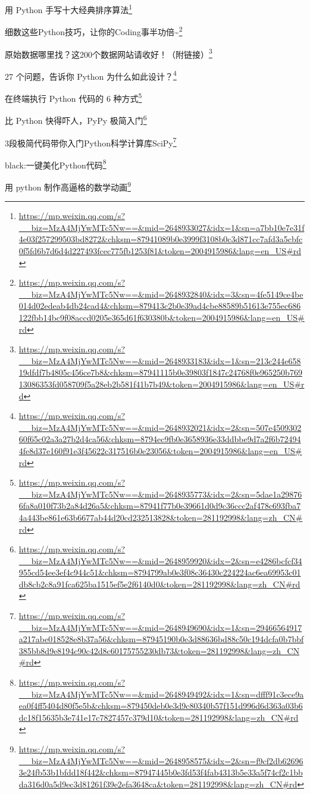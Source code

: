 \documentclass[]{ctexbook}
\renewcommand{\href}[2]{#2\footnote{\url{#1}}}
\begin{document}
\href{https://mp.weixin.qq.com/s?__biz=MzA4MjYwMTc5Nw==\&mid=2648933027\&idx=1\&sn=a7bb10e7e31f4e03f257299503bd8272\&chksm=87941089b0e3999f3108b0c3d871cc7afd3a5cbfc0f5fd6b7d6d4d227493fcec775fb1253f81\&token=2004915986\&lang=en_US\#rd}{用 Python 手写十大经典排序算法}

\href{https://mp.weixin.qq.com/s?__biz=MzA4MjYwMTc5Nw==\&mid=2648932840\&idx=3\&sn=4fe5149ce4be014d02edeab4db24cad4\&chksm=879413c2b0e39ad4cbe88589b51613e755ec686122fbb14bc9f08accd0205e365d61f630380b\&token=2004915986\&lang=en_US\#rd}{细数这些Python技巧，让你的Coding事半功倍\textasciitilde{}}

\href{https://mp.weixin.qq.com/s?__biz=MzA4MjYwMTc5Nw==\&mid=2648933183\&idx=1\&sn=213c244e65819dfdf7b4805c456ce7b8\&chksm=87941115b0e39803f1847c24768f0e965250b76913086353fd058709f5a28eb2b581f41b7b49\&token=2004915986\&lang=en_US\#rd}{原始数据哪里找？这200个数据网站请收好！（附链接）}

\href{https://mp.weixin.qq.com/s?__biz=MzA4MjYwMTc5Nw==\&mid=2648932021\&idx=2\&sn=507e450930260f65c02a3a27b2d4ca56\&chksm=8794ec9fb0e3658936e33ddbbe9d7a2f6b724944fe8d37e160f91e3f45622c317516b0e23056\&token=2004915986\&lang=en_US\#rd}{27 个问题，告诉你 Python 为什么如此设计？}

\href{https://mp.weixin.qq.com/s?__biz=MzA4MjYwMTc5Nw==\&mid=2648935773\&idx=2\&sn=5dae1a298766fa8a010f73b2a84d26a5\&chksm=87941f77b0e39661d0d9c36ccc2af478c693fba74a443be861e63b6677ab44d20cd232513828\&token=281192998\&lang=zh_CN\#rd}{在终端执行 Python 代码的 6 种方式}

\href{https://mp.weixin.qq.com/s?__biz=MzA4MjYwMTc5Nw==\&mid=2648959920\&idx=2\&sn=e4286bcfcf34955cd54ee3ef4c944c51\&chksm=8794799ab0e3f08c36430c224224ac6ea69953c01db8cb2c8a91fca625ba1515ef5e2f6140d0\&token=281192998\&lang=zh_CN\#rd}{比 Python 快得吓人，PyPy 极简入门}

\href{https://mp.weixin.qq.com/s?__biz=MzA4MjYwMTc5Nw==\&mid=2648949690\&idx=1\&sn=29466564917a217abe018528e8b37a56\&chksm=87945190b0e3d88636bd88c50c194dcfa0b7bbf385bb8d9e8194c90c42d8c60175755230db73\&token=281192998\&lang=zh_CN\#rd}{3段极简代码带你入门Python科学计算库SciPy}

\href{https://mp.weixin.qq.com/s?__biz=MzA4MjYwMTc5Nw==\&mid=2648949492\&idx=1\&sn=dfff91c3ece9aea0f4ff5404d80f5e5b\&chksm=879450deb0e3d9c80340b57f151d996d6d363a03b6dc18f15635b3e741e17c7827457c379d10\&token=281192998\&lang=zh_CN\#rd}{black:一键美化Python代码}

\href{https://mp.weixin.qq.com/s?__biz=MzA4MjYwMTc5Nw==\&mid=2648958575\&idx=2\&sn=f9cf2db626963e24fb53b1bfdd18f442\&chksm=87947445b0e3fd53f4fab4313b5e33a5f74cf2c1bbda316d0a5d9ec3d81261f39e2efa3648ca\&token=281192998\&lang=zh_CN\#rd}{用 python 制作高逼格的数学动画}
\end{document}
